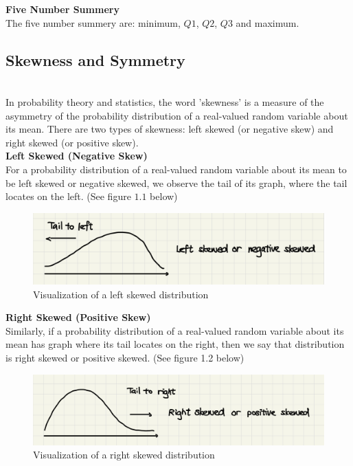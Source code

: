 \textbf{Five Number Summery}\\

\noindent
The five number summery are: minimum, $Q1$, $Q2$, $Q3$ and maximum.


\subsection{Skewness and Symmetry}\\

In probability theory and statistics, the word 'skewness' is a measure of the asymmetry of the probability distribution of a real-valued random variable about its mean. There are two types of skewness: left skewed (or negative skew) and right skewed (or positive skew).\\

\noindent
\textbf{Left Skewed (Negative Skew)}\\

\noindent
For a probability distribution of a real-valued random variable about its mean to be left skewed or negative skewed, we observe the tail of its graph, where the tail locates on the left. (See figure $1.1$ below)

\begin{figure}[H]
 \centering
 \includegraphics[scale=0.25]{Section1/img/LeftSkewed.jpg}
 \caption{Visualization of a left skewed distribution}
\end{figure}

\noindent
\textbf{Right Skewed (Positive Skew)}\\

\noindent
Similarly, if a probability distribution of a real-valued random variable about its mean has graph where its tail locates on the right, then we say that distribution is right skewed or positive skewed. (See figure 1.2 below)

\begin{figure}[H]
 \centering
 \includegraphics[scale=0.25]{Section1/img/RightSkewed.jpg}
 \caption{Visualization of a right skewed distribution}
\end{figure}

